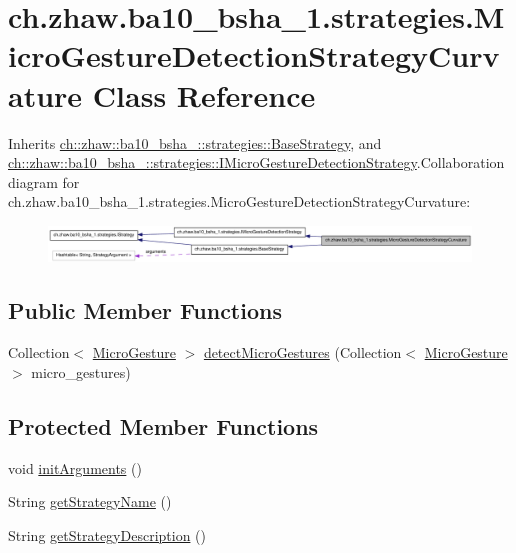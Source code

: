 \hypertarget{classch_1_1zhaw_1_1ba10__bsha__1_1_1strategies_1_1MicroGestureDetectionStrategyCurvature}{
\section{ch.zhaw.ba10\_\-bsha\_\-1.strategies.MicroGestureDetectionStrategyCurvature Class Reference}
\label{classch_1_1zhaw_1_1ba10__bsha__1_1_1strategies_1_1MicroGestureDetectionStrategyCurvature}
}


Inherits \hyperlink{classch_1_1zhaw_1_1ba10__bsha__1_1_1strategies_1_1BaseStrategy}{ch::zhaw::ba10\_\-bsha\_::strategies::BaseStrategy}, and \hyperlink{interfacech_1_1zhaw_1_1ba10__bsha__1_1_1strategies_1_1IMicroGestureDetectionStrategy}{ch::zhaw::ba10\_\-bsha\_::strategies::IMicroGestureDetectionStrategy}.Collaboration diagram for ch.zhaw.ba10\_\-bsha\_\-1.strategies.MicroGestureDetectionStrategyCurvature:\nopagebreak
\begin{figure}[H]
\begin{center}
\leavevmode
\includegraphics[width=400pt]{classch_1_1zhaw_1_1ba10__bsha__1_1_1strategies_1_1MicroGestureDetectionStrategyCurvature__coll__graph}
\end{center}
\end{figure}
\subsection*{Public Member Functions}
\begin{DoxyCompactItemize}
\item 
Collection$<$ \hyperlink{classch_1_1zhaw_1_1ba10__bsha__1_1_1service_1_1MicroGesture}{MicroGesture} $>$ \hyperlink{classch_1_1zhaw_1_1ba10__bsha__1_1_1strategies_1_1MicroGestureDetectionStrategyCurvature_a939545a8c5597d693f4857a8f6195fc9}{detectMicroGestures} (Collection$<$ \hyperlink{classch_1_1zhaw_1_1ba10__bsha__1_1_1service_1_1MicroGesture}{MicroGesture} $>$ micro\_\-gestures)
\end{DoxyCompactItemize}
\subsection*{Protected Member Functions}
\begin{DoxyCompactItemize}
\item 
void \hyperlink{classch_1_1zhaw_1_1ba10__bsha__1_1_1strategies_1_1MicroGestureDetectionStrategyCurvature_afc93fdc088cd9449668b5e277bf5c8f6}{initArguments} ()
\item 
String \hyperlink{classch_1_1zhaw_1_1ba10__bsha__1_1_1strategies_1_1MicroGestureDetectionStrategyCurvature_acd5003f685af87709425848adde5bc0f}{getStrategyName} ()
\item 
String \hyperlink{classch_1_1zhaw_1_1ba10__bsha__1_1_1strategies_1_1MicroGestureDetectionStrategyCurvature_a78946977e95404053d40384e51b889e2}{getStrategyDescription} ()
\end{DoxyCompactItemize}
